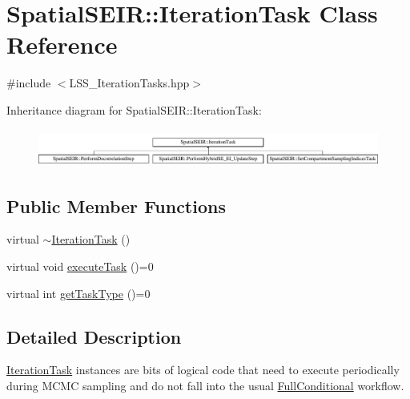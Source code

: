 \hypertarget{classSpatialSEIR_1_1IterationTask}{\section{Spatial\-S\-E\-I\-R\-:\-:Iteration\-Task Class Reference}
\label{classSpatialSEIR_1_1IterationTask}
}


{\ttfamily \#include $<$L\-S\-S\-\_\-\-Iteration\-Tasks.\-hpp$>$}

Inheritance diagram for Spatial\-S\-E\-I\-R\-:\-:Iteration\-Task\-:\begin{figure}[H]
\begin{center}
\leavevmode
\includegraphics[height=1.248607cm]{classSpatialSEIR_1_1IterationTask}
\end{center}
\end{figure}
\subsection*{Public Member Functions}
\begin{DoxyCompactItemize}
\item 
virtual \hyperlink{classSpatialSEIR_1_1IterationTask_a042b6341e3fdf211ec7c6bf954b4258d}{$\sim$\-Iteration\-Task} ()
\item 
virtual void \hyperlink{classSpatialSEIR_1_1IterationTask_a68fcb08fe777ed506c97dc1ac5a0fb54}{execute\-Task} ()=0
\item 
virtual int \hyperlink{classSpatialSEIR_1_1IterationTask_aaba9c737c4564df6b44b843d7c781722}{get\-Task\-Type} ()=0
\end{DoxyCompactItemize}


\subsection{Detailed Description}
\hyperlink{classSpatialSEIR_1_1IterationTask}{Iteration\-Task} instances are bits of logical code that need to execute periodically during M\-C\-M\-C sampling and do not fall into the usual \hyperlink{classSpatialSEIR_1_1FullConditional}{Full\-Conditional} workflow. 


